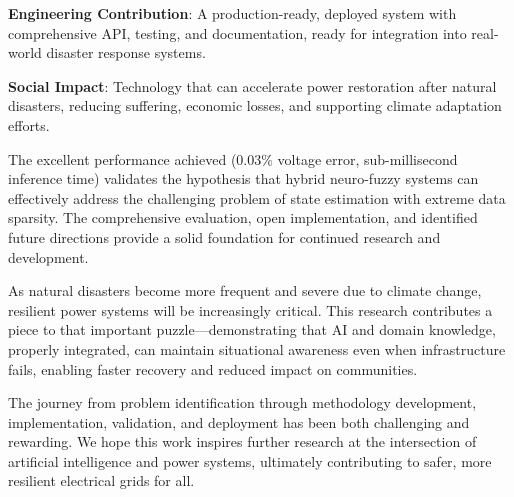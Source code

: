 \documentclass[12pt,a4paper]{report}
\begin{document}
\textbf{Engineering Contribution}: A production-ready, deployed system with comprehensive API, testing, and documentation, ready for integration into real-world disaster response systems.

\textbf{Social Impact}: Technology that can accelerate power restoration after natural disasters, reducing suffering, economic losses, and supporting climate adaptation efforts.

The excellent performance achieved (0.03\% voltage error, sub-millisecond inference time) validates the hypothesis that hybrid neuro-fuzzy systems can effectively address the challenging problem of state estimation with extreme data sparsity. The comprehensive evaluation, open implementation, and identified future directions provide a solid foundation for continued research and development.

As natural disasters become more frequent and severe due to climate change, resilient power systems will be increasingly critical. This research contributes a piece to that important puzzle—demonstrating that AI and domain knowledge, properly integrated, can maintain situational awareness even when infrastructure fails, enabling faster recovery and reduced impact on communities.

The journey from problem identification through methodology development, implementation, validation, and deployment has been both challenging and rewarding. We hope this work inspires further research at the intersection of artificial intelligence and power systems, ultimately contributing to safer, more resilient electrical grids for all.
\end{document}
